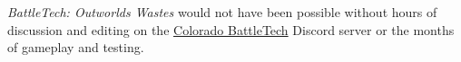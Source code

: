 \emph{BattleTech: Outworlds Wastes} would not have been possible without hours of discussion and editing on the \href{https://coloradobt.org}{Colorado BattleTech} Discord server or the months of gameplay and testing.

